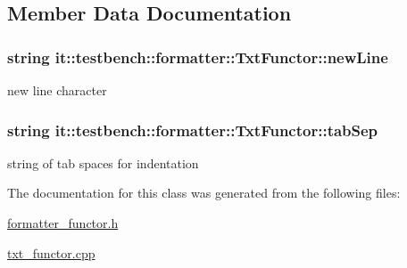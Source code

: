 \subsection{Member Data Documentation}
\hypertarget{classit_1_1testbench_1_1formatter_1_1TxtFunctor_a81f9f729eaf376b71dc1d19a4dda2315}{
\subsubsection[{new\-Line}]{\setlength{\rightskip}{0pt plus 5cm}string it\-::testbench\-::formatter\-::\-Txt\-Functor\-::new\-Line\hspace{0.3cm}{\ttfamily [private]}}}\label{d3/d73/classit_1_1testbench_1_1formatter_1_1TxtFunctor_a81f9f729eaf376b71dc1d19a4dda2315}
new line character \hypertarget{classit_1_1testbench_1_1formatter_1_1TxtFunctor_a995a591c267a51441713f6bfcd73dc4a}{
\subsubsection[{tab\-Sep}]{\setlength{\rightskip}{0pt plus 5cm}string it\-::testbench\-::formatter\-::\-Txt\-Functor\-::tab\-Sep\hspace{0.3cm}{\ttfamily [private]}}}\label{d3/d73/classit_1_1testbench_1_1formatter_1_1TxtFunctor_a995a591c267a51441713f6bfcd73dc4a}
string of tab spaces for indentation 

The documentation for this class was generated from the following files\-:\begin{DoxyCompactItemize}
\item 
\hyperlink{formatter__functor_8h}{formatter\-\_\-functor.\-h}\item 
\hyperlink{txt__functor_8cpp}{txt\-\_\-functor.\-cpp}\end{DoxyCompactItemize}
